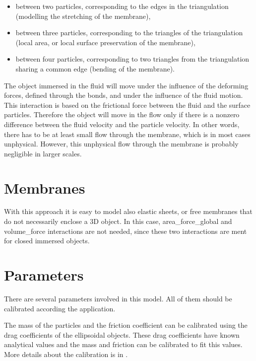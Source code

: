 \begin{itemize}
\item between two particles, corresponding to the edges in the triangulation (modelling 
the stretching of the membrane), 
\item between three particles, corresponding to the triangles of the triangulation (local 
area, or local surface preservation of the membrane), 
\item between four particles, corresponding to two triangles from the triangulation sharing 
a common edge (bending of the membrane). 
\end{itemize}

The object immersed  in the fluid will move under the influence of the deforming forces, 
defined through the bonds, and under the influence of the fluid motion. This interaction 
is based on the frictional force between the fluid and the surface particles. Therefore 
the object will move in the flow only if there is a nonzero difference between the fluid 
velocity and the particle velocity. In other words, there has to be at least small flow
through the membrane, which is in most cases unphysical. However, this unphysical flow 
through the membrane is probably negligible in larger scales.

\section{Membranes}
With this approach it is easy to model also elastic sheets, or free membranes that do 
not necessarily enclose a 3D object. In this case, area\_{}force\_{}global and 
volume\_{}force interactions are not needed, since these two interactions are ment for 
closed immersed objects.

\section{Parameters}
There are several parameters involved in this model. All of them should be calibrated
according the application. 
The mass of the particles and the friction coefficient can be calibrated using the drag 
coefficients of the ellipsoidal objects. These drag coefficients have known analytical 
values and the mass and friction can be calibrated to fit this values. More details about 
the calibration is in \cite{cimrak}.

